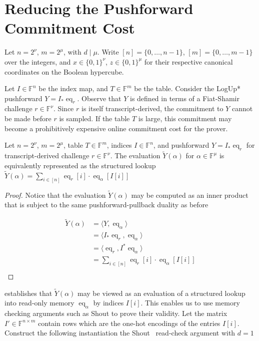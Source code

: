 \section{Reducing the Pushforward Commitment Cost}

Let $n=2^\nu$, $m=2^\mu$, with $d\mid\mu$. Write 
$[n]=\{0,\ldots,n-1\}$, $[m]=\{0,\ldots,m-1\}$ over the integers, and 
$x \in \{0,1\}^\nu$, $z \in \{0,1\}^\mu$ for their respective canonical coordinates 
on the Boolean hypercube. 

Let $I\in\mathbb{F}^n$ be the index map, and $T\in\mathbb{F}^m$ be the table.
Consider the LogUp* pushforward $Y = I_*\operatorname{eq}_r$. Observe that $Y$ is defined in terms 
of a Fiat-Shamir challenge $r\in\mathbb{F}^\nu$. Since $r$ is itself transcript-derived, 
the commitment to $Y$ cannot be made before $r$ is sampled. If the table 
$T$ is large, this commitment may become a prohibitively expensive online commitment 
cost for the prover.


\begin{lemma}\label{lem:lookup}\label{lem:pushforward}
Let $n=2^\nu$, $m=2^\mu$, table $T \in \mathbb{F}^m$, indices $I \in \mathbb{F}^n$,
and pushforward $Y = I_*\operatorname{eq}_r$ for transcript-derived challenge $r \in \mathbb{F}^{\nu}$. 
The evaluation $\widetilde{Y}(\alpha)$ for $\alpha\in\mathbb{F}^\mu$ is equivalently represented as 
the structured lookup $\widetilde{Y}(\alpha) = \sum_{i \in [n]} \operatorname{eq}_r[i] \cdot \operatorname{eq}_\alpha[I[i]]$
\end{lemma}

\begin{proof}
Notice that the evaluation $\widetilde{Y}(\alpha)$ may be computed as an inner product that is subject 
to the same pushforward-pullback duality as before

$$
\begin{aligned}
\widetilde{Y}(\alpha) &= \langle Y, \operatorname{eq}_\alpha \rangle \\
&= \langle I_*\operatorname{eq}_r, \operatorname{eq}_\alpha \rangle \\
&= \langle \operatorname{eq}_r, I^* \operatorname{eq}_\alpha \rangle \\
&= \sum_{i \in [n]} \operatorname{eq}_r[i] \cdot \operatorname{eq}_\alpha[I[i]] \\
\end{aligned}
$$

\end{proof}


 establishes that $\widetilde{Y}(\alpha)$ may be viewed as an evaluation of a
structured lookup into read-only memory $\operatorname{eq}_\alpha$ by indices $I[i]$. This enables 
us to use memory checking arguments such as Shout to prove their validity.
Let the matrix $I' \in \mathbb{F}^{n \times m}$ contain rows which are the one-hot encodings of the 
entries $I[i]$.  Construct the following instantiation the Shout~\cite{cryptoeprint:2025/105} 
read-check argument with $d=1$


